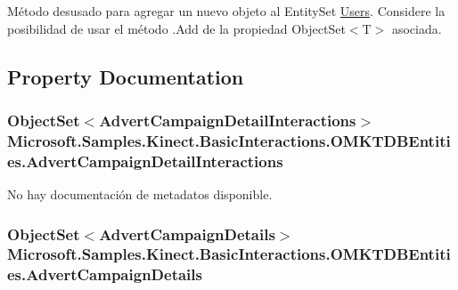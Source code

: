 Método desusado para agregar un nuevo objeto al Entity\-Set \hyperlink{class_microsoft_1_1_samples_1_1_kinect_1_1_basic_interactions_1_1_users}{Users}. Considere la posibilidad de usar el método .Add de la propiedad Object\-Set$<$T$>$ asociada. 



\subsection{Property Documentation}
\hypertarget{class_microsoft_1_1_samples_1_1_kinect_1_1_basic_interactions_1_1_o_m_k_t_d_b_entities_abad6d6824de7bf15745aec0aab357814}{
\subsubsection[{Advert\-Campaign\-Detail\-Interactions}]{\setlength{\rightskip}{0pt plus 5cm}Object\-Set$<${\bf Advert\-Campaign\-Detail\-Interactions}$>$ Microsoft.\-Samples.\-Kinect.\-Basic\-Interactions.\-O\-M\-K\-T\-D\-B\-Entities.\-Advert\-Campaign\-Detail\-Interactions\hspace{0.3cm}{\ttfamily [get]}}}\label{class_microsoft_1_1_samples_1_1_kinect_1_1_basic_interactions_1_1_o_m_k_t_d_b_entities_abad6d6824de7bf15745aec0aab357814}


No hay documentación de metadatos disponible. 

\hypertarget{class_microsoft_1_1_samples_1_1_kinect_1_1_basic_interactions_1_1_o_m_k_t_d_b_entities_aaa0a59fada97a29b9f5d81fa6bf42f97}{
\subsubsection[{Advert\-Campaign\-Details}]{\setlength{\rightskip}{0pt plus 5cm}Object\-Set$<${\bf Advert\-Campaign\-Details}$>$ Microsoft.\-Samples.\-Kinect.\-Basic\-Interactions.\-O\-M\-K\-T\-D\-B\-Entities.\-Advert\-Campaign\-Details\hspace{0.3cm}{\ttfamily [get]}}}\label{class_microsoft_1_1_samples_1_1_kinect_1_1_basic_interactions_1_1_o_m_k_t_d_b_entities_aaa0a59fada97a29b9f5d81fa6bf42f97}


